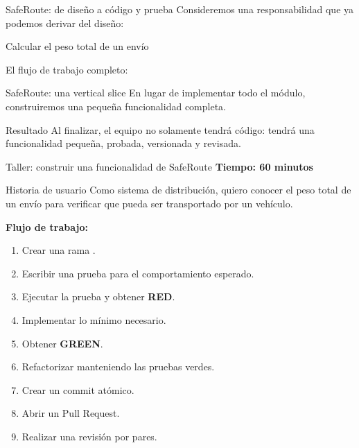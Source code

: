 \documentclass[11pt,aspectratio=169]{beamer}
\begin{document}
\begin{frame}{SafeRoute: de diseño a código y prueba}
Consideremos una responsabilidad que ya podemos derivar del diseño:
\begin{statement}Calcular el peso total de un envío\end{statement}


El flujo de trabajo completo:
\begin{center}
\end{center}
\end{frame}

\begin{frame}{SafeRoute: una vertical slice}
En lugar de implementar todo el módulo, construiremos una pequeña
funcionalidad completa.


\begin{block}{Resultado}
  Al finalizar, el equipo no solamente tendrá código: tendrá una
  funcionalidad pequeña, probada, versionada y revisada.
\end{block}
\end{frame}

\begin{frame}{Taller: construir una funcionalidad de SafeRoute}
\alert{\textbf{Tiempo: 60 minutos}}

\begin{twocol}[split=0.5]
  \begin{block}{Historia de usuario}
    Como sistema de distribución, quiero conocer el peso total de un envío
    para verificar que pueda ser transportado por un vehículo.
  \end{block}
\nextcol
  \textbf{Flujo de trabajo:}
  \begin{enumerate}\footnotesize
    \item Crear una rama .
    \item Escribir una prueba para el comportamiento esperado.
    \item Ejecutar la prueba y obtener \textbf{RED}.
    \item Implementar lo mínimo necesario.
    \item Obtener \textbf{GREEN}.
    \item Refactorizar manteniendo las pruebas verdes.
    \item Crear un commit atómico.
    \item Abrir un Pull Request.
    \item Realizar una revisión por pares.
  \end{enumerate}
\end{twocol}
\end{frame}
\end{document}
